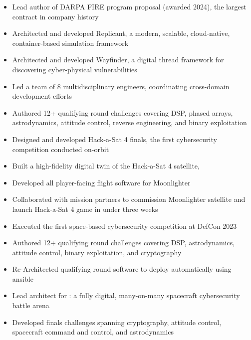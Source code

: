 \EndJob
{}
        \begin{itemize}
            \item Lead author of DARPA FIRE program proposal (awarded 2024), the largest contract in company history
            \item Architected and developed Replicant, a modern, scalable, cloud-native, container-based simulation framework
            \item Architected and developed Wayfinder, a digital thread framework for discovering cyber-physical vulnerabilities
            \item Led a team of 8 multidisciplinary engineers, coordinating cross-domain development efforts
        \end{itemize}
        \begin{itemize}
            \item Authored 12+ qualifying round challenges covering DSP, phased arrays, astrodynamics, attitude control, reverse engineering, and binary exploitation
            \item Designed and developed Hack-a-Sat 4 finals, the first cybersecurity competition conducted on-orbit
            \item Built a high-fidelity digital twin of the Hack-a-Sat 4 satellite, 
            \item Developed all player-facing flight software for Moonlighter
            \item Collaborated with mission partners to commission Moonlighter satellite and launch Hack-a-Sat 4 game in under three weeks
            \item Executed the first space-based cybersecurity competition at DefCon 2023
        \end{itemize}
        \begin{itemize}
            \item Authored 12+ qualifying round challenges covering DSP, astrodynamics, attitude control, binary exploitation, and cryptography
            \item Re-Architected qualifying round software to deploy automatically using ansible
            \item Lead architect for : a fully digital, many-on-many spacecraft cybersecurity battle arena 
            \item Developed finals challenges spanning cryptography, attitude control, spacecraft command and control, and astrodynamics
        \end{itemize}
\EndJob